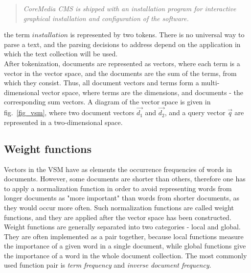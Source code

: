 \begin{quote}
\textit{CoreMedia CMS is shipped with an installation program for interactive graphical installation and configuration of the software.}
\end{quote}

the term $ installation $ is represented by two tokens. There is no universal way to parse a text, and the parsing decisions to address depend on the application in which the text collection will be used. \\

After tokenization, documents are represented as vectors, where each term is a vector in the vector space, and the documents are the sum of the terms, from which they consist. Thus, all document vectors and terms form a multi-dimensional vector space, where terms are the dimensions, and documents - the corresponding sum vectors. A diagram of the vector space is given in fig.~\ref{fig_vsm}, where two document vectors $\vec{d_{1}}$ and $\vec{d_{2}}$, and a query vector $\vec{q}$ are represented in a two-dimensional space. \\

\subsection{Weight functions}
\label{lsa:weight_functions}
Vectors in the \gls{VSM} have as elements the occurrence frequencies of words in documents. However, some documents are shorter than others, therefore one has to apply a normalization function in order to avoid representing words from longer documents as "more important" than words from shorter documents, as they would occur more often. Such normalization functions are called weight functions, and they are applied after the vector space has been constructed. \\

Weight functions are generally separated into two categories - local and global. They are often implemented as a pair together, because local functions measure the importance of a given word in a single document, while global functions give the importance of a word in the whole document collection. The most commonly used function pair is \textit{term frequency} and \textit{inverse document frequency}. \\

